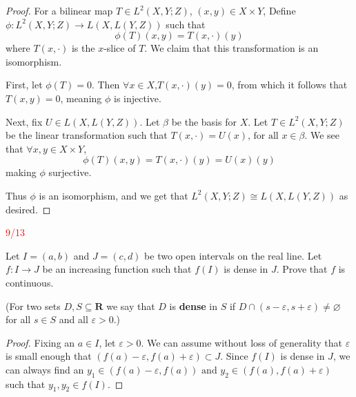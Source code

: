 \documentclass{article}
\newcommand{\R}{\mathbf{R}}
\newcommand{\due}[1]{\reversemarginpar\marginnote
    {\textcolor{red}{#1}}
    }
\theoremstyle{definition}
\begin{document}
   \begin{proof}
        For a bilinear map \(T \in L^2(X,Y;Z)\), \((x,y) \in X \times Y\), Define \(\phi : L^2(X,Y;Z) \to L(X,L(Y,Z))\) such that
        \[
            \phi (T)(x,y) = T(x, \cdot)(y)
        \]  
        where \(T(x,\cdot)\) is the \(x\)-slice of \(T\). We claim that this transformation is an isomorphism.

        First, let \(\phi (T) = 0\). Then \(\forall x \in X \text{,} T(x, \cdot)(y) = 0\), from which it follows that \(T(x, y) = 0\), meaning \(\phi\) is injective. 
        
        Next, fix \(U \in L(X,L(Y,Z))\). Let \(\beta \) be the basis for \(X\). Let \(T \in L^2(X,Y;Z)\) be the linear transformation such that \(T(x, \cdot) = U(x) \text{, for all } x \in \beta \). We see that \(\forall x,y \in X \times Y\),
        \[
            \phi (T)(x,y) = T(x, \cdot)(y) = U(x)(y)
        \]
        making \(\phi \) surjective.

        Thus \(\phi \) is an isomorphism, and we get that \(L^2(X,Y;Z) \cong L(X,L(Y,Z))\) as desired.
   \end{proof}

\exercise \due{9/13}
    Let $I=(a,b)$ and $J=(c,d)$ be two open intervals on the real line. Let $f:I\rightarrow J$ be an increasing function such that $f(I)$ is dense in $J$. Prove that $f$ is continuous.

    (For two sets $D,S\subseteq \R$ we say that $D$ is \textbf{dense} in $S$ if $D\cap (s-\varepsilon,s+\varepsilon)\neq\varnothing$ for all $s\in S$ and all $\varepsilon>0$.)
\begin{proof}
    Fixing an \(a \in I\), let \(\varepsilon > 0\). We can assume without loss of generality that \(\varepsilon \) is small enough that \((f(a) - \varepsilon , f(a) + \varepsilon ) \subset J\). Since \(f(I)\) is dense in \(J\), we can always find an \(y_1 \in (f(a) - \varepsilon , f(a)) \text{ and } y_2 \in (f(a), f(a) + \varepsilon )\) such that \(y_1 , y_2 \in f(I)\). 

\end{proof}
\end{document}

